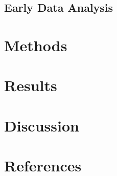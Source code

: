 \documentclass[]{article}
\begin{document}
\hypertarget{sec:eda}{%
\subsection{Early Data Analysis}\label{sec:eda}}

\hypertarget{sec:methods}{%
\section{Methods}\label{sec:methods}}

\hypertarget{sec:results}{%
\section{Results}\label{sec:results}}

\hypertarget{sec:discussion}{%
\section{Discussion}\label{sec:discussion}}

\hypertarget{sec:refs}{%
\section{References}\label{sec:refs}}
\end{document}
